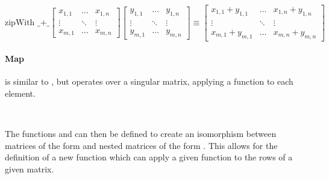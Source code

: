 \begin{displaymath}
  \text{zipWith  \_+\_}
  \begin{bmatrix}
    x_{1,1} & \dots  & x_{1,n} \\
    \vdots  & \ddots & \vdots \\
    x_{m,1} & \dots  & x_{m,n}
  \end{bmatrix}
  \begin{bmatrix}
    y_{1,1} & \dots  & y_{1,n} \\
    \vdots  & \ddots & \vdots \\
    y_{m,1} & \dots  & y_{m,n}
  \end{bmatrix}
  \equiv 
  \begin{bmatrix}
    x_{1,1} + y_{1,1} & \dots  & x_{1,n} + y_{1,n} \\
    \vdots                  & \ddots & \vdots \\
    x_{m,1} + y_{m,1} & \dots  & x_{m,n} + y_{m,n}
  \end{bmatrix}
\end{displaymath}


\paragraph{Map} is similar to , but operates over a singular matrix, 
applying a function  to each element.
\begin{code}%
%
\>[2]\AgdaSpace{}%
\AgdaSymbol{:}\AgdaSpace{}%
\AgdaSymbol{(}\AgdaSpace{}%
\AgdaSymbol{:}\AgdaSpace{}%
\AgdaSpace{}%
\AgdaSpace{}%
\AgdaSymbol{)}\AgdaSpace{}%
\AgdaSpace{}%
\AgdaSpace{}%
\AgdaSpace{}%
\AgdaSpace{}%
\AgdaSpace{}%
\AgdaSpace{}%
\AgdaSpace{}%
\<%
\\
%
\>[2]\AgdaSpace{}%
\AgdaSpace{}%
\AgdaSpace{}%
\AgdaSpace{}%
\AgdaSymbol{=}\AgdaSpace{}%
\AgdaSpace{}%
\AgdaSymbol{(}\AgdaSpace{}%
\AgdaSymbol{)}\<%
\end{code}
The functions  and  can then be defined to create an 
isomorphism between matrices of the form  and nested matrices 
of the form .
This allows for the definition of a new function  which can apply a
given function to the rows of a given matrix.

